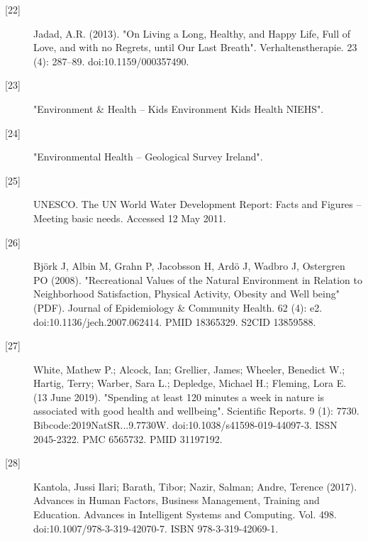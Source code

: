 {\begin{description}
\item[{[22]}] Jadad, A.R. (2013). "On Living a Long, Healthy, and Happy Life, Full of Love, and with no Regrets, until Our Last Breath". Verhaltenstherapie. 23 (4): 287–89. doi:10.1159/000357490.
\item[{[23]}] "Environment \& Health – Kids Environment Kids Health NIEHS".
\item[{[24]}] "Environmental Health – Geological Survey Ireland".
\item[{[25]}] UNESCO. The UN World Water Development Report: Facts and Figures – Meeting basic needs. Accessed 12 May 2011.
\item[{[26]}] Björk J, Albin M, Grahn P, Jacobsson H, Ardö J, Wadbro J, Ostergren PO (2008). "Recreational Values of the Natural Environment in Relation to Neighborhood Satisfaction, Physical Activity, Obesity and Well being" (PDF). Journal of Epidemiology \& Community Health. 62 (4): e2. doi:10.1136/jech.2007.062414. PMID 18365329. S2CID 13859588.
\item[{[27]}] White, Mathew P.; Alcock, Ian; Grellier, James; Wheeler, Benedict W.; Hartig, Terry; Warber, Sara L.; Depledge, Michael H.; Fleming, Lora E. (13 June 2019). "Spending at least 120 minutes a week in nature is associated with good health and wellbeing". Scientific Reports. 9 (1): 7730. Bibcode:2019NatSR...9.7730W. doi:10.1038/s41598-019-44097-3. ISSN 2045-2322. PMC 6565732. PMID 31197192.
\item[{[28]}] Kantola, Jussi Ilari; Barath, Tibor; Nazir, Salman; Andre, Terence (2017). Advances in Human Factors, Business Management, Training and Education. Advances in Intelligent Systems and Computing. Vol. 498. doi:10.1007/978-3-319-42070-7. ISBN 978-3-319-42069-1.
\end{description}}
